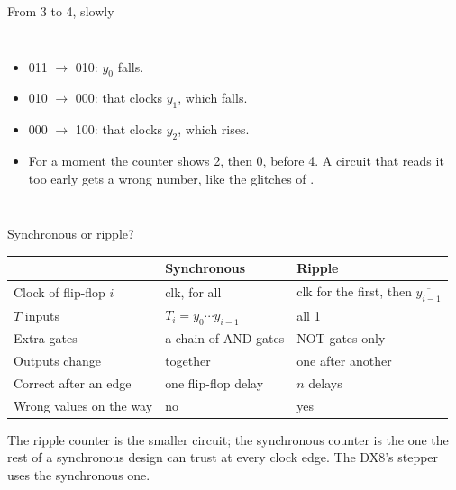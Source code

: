 \documentclass[10pt]{wosm-slides}
\begin{document}
\begin{frame}{From 3 to 4, slowly}
  \begin{columns}[c, totalwidth=\textwidth]
      \centering
      \begin{itemize}
        \item 011 $\to$ 010: $y_0$ falls.
        \item 010 $\to$ 000: that clocks $y_1$, which falls.
        \item 000 $\to$ 100: that clocks $y_2$, which rises.
        \item For a moment the counter shows 2, then 0, before 4. A circuit that
          reads it too early gets a wrong number, like the glitches of
          .
      \end{itemize}
  \end{columns}
\end{frame}

\begin{frame}{Synchronous or ripple?}
  \begin{center}
    \begin{tabular}{@{}lll@{}}
      \toprule
       & Synchronous & Ripple \\
      \midrule
      Clock of flip-flop $i$ & clk, for all & clk for the first, then
        $\overline{y_{i-1}}$ \\
      $T$ inputs & $T_i = y_0 \cdots y_{i-1}$ & all 1 \\
      Extra gates & a chain of AND gates & NOT gates only \\
      Outputs change & together & one after another \\
      Correct after an edge & one flip-flop delay & $n$ delays \\
      Wrong values on the way & no & yes \\
      \bottomrule
    \end{tabular}
  \end{center}

  \begin{remark}
    The ripple counter is the smaller circuit; the synchronous counter is the one
    the rest of a synchronous design can trust at every clock edge. The DX8's
    stepper uses the synchronous one.
  \end{remark}
\end{frame}
\end{document}
